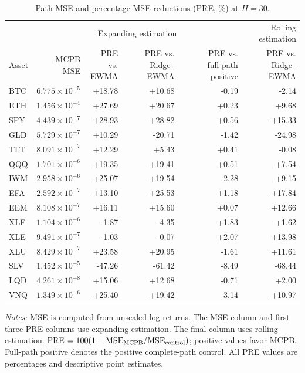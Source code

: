 \begin{table}[tbp]
\centering\small
\setlength{\tabcolsep}{4pt}
\renewcommand{\arraystretch}{1.12}
\caption{Path MSE and percentage MSE reductions (PRE, \%) at $H=30$.}
\label{tab:asset_accuracy}
\begin{tabular}{lrrrrr}
\toprule
 & \multicolumn{4}{c}{Expanding estimation} & \shortstack{Rolling\\estimation} \\
\cmidrule(lr){2-5}\cmidrule(lr){6-6}
Asset & \shortstack{MCPB\\MSE} & \shortstack{PRE vs.\\EWMA} & \shortstack{PRE vs.\\Ridge--EWMA} & \shortstack{PRE vs.\\full-path positive} & \shortstack{PRE vs.\\Ridge--EWMA} \\
\midrule
BTC & $6.775\times10^{-5}$ & +18.78 & +10.68 & -0.19 & -2.14 \\
ETH & $1.456\times10^{-4}$ & +27.69 & +20.67 & +0.23 & +9.68 \\
SPY & $4.439\times10^{-7}$ & +28.93 & +28.82 & +0.56 & +15.33 \\
GLD & $5.729\times10^{-7}$ & +10.29 & -20.71 & -1.42 & -24.98 \\
TLT & $8.091\times10^{-7}$ & +12.29 & +5.43 & +0.41 & -0.08 \\
QQQ & $1.701\times10^{-6}$ & +19.35 & +19.41 & +0.51 & +7.54 \\
IWM & $2.958\times10^{-6}$ & +25.07 & +19.54 & -2.28 & +9.15 \\
EFA & $2.592\times10^{-7}$ & +13.10 & +25.53 & +1.18 & +17.84 \\
EEM & $8.108\times10^{-7}$ & +16.11 & +15.60 & +0.07 & +12.66 \\
XLF & $1.104\times10^{-6}$ & -1.87 & -4.35 & +1.83 & +1.62 \\
XLE & $9.491\times10^{-7}$ & -1.03 & -0.07 & +2.07 & +13.98 \\
XLU & $8.429\times10^{-7}$ & +23.58 & +20.95 & -1.61 & +11.61 \\
SLV & $1.452\times10^{-5}$ & -47.26 & -61.42 & -8.49 & -68.44 \\
LQD & $4.261\times10^{-8}$ & +15.06 & +12.68 & -0.71 & +2.00 \\
VNQ & $1.349\times10^{-6}$ & +25.40 & +19.42 & -3.14 & +10.97 \\
\bottomrule
\end{tabular}
\par\smallskip
\begin{minipage}{0.98\linewidth}\footnotesize
\textit{Notes:} MSE is computed from unscaled log returns. The MSE column and first three PRE columns use expanding estimation. The final column uses rolling estimation. PRE $=100(1-\mathrm{MSE}_{\rm MCPB}/\mathrm{MSE}_{\rm control})$; positive values favor MCPB. Full-path positive denotes the positive complete-path control. All PRE values are percentages and descriptive point estimates.
\end{minipage}
\end{table}
